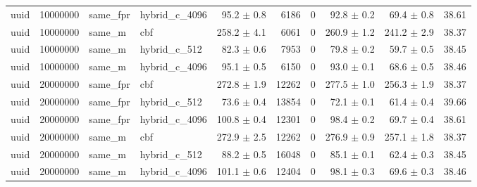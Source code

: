 \begin{tabular}{llllrrrrrr}
uuid & 10000000 & same\_fpr & hybrid\_c\_4096 & 95.2 $\pm$ 0.8 & 6186 & 0 & 92.8 $\pm$ 0.2 & 69.4 $\pm$ 0.8 & 38.61 \\
uuid & 10000000 & same\_m & cbf & 258.2 $\pm$ 4.1 & 6061 & 0 & 260.9 $\pm$ 1.2 & 241.2 $\pm$ 2.9 & 38.37 \\
uuid & 10000000 & same\_m & hybrid\_c\_512 & 82.3 $\pm$ 0.6 & 7953 & 0 & 79.8 $\pm$ 0.2 & 59.7 $\pm$ 0.5 & 38.45 \\
uuid & 10000000 & same\_m & hybrid\_c\_4096 & 95.1 $\pm$ 0.5 & 6150 & 0 & 93.0 $\pm$ 0.1 & 68.6 $\pm$ 0.5 & 38.46 \\
uuid & 20000000 & same\_fpr & cbf & 272.8 $\pm$ 1.9 & 12262 & 0 & 277.5 $\pm$ 1.0 & 256.3 $\pm$ 1.9 & 38.37 \\
uuid & 20000000 & same\_fpr & hybrid\_c\_512 & 73.6 $\pm$ 0.4 & 13854 & 0 & 72.1 $\pm$ 0.1 & 61.4 $\pm$ 0.4 & 39.66 \\
uuid & 20000000 & same\_fpr & hybrid\_c\_4096 & 100.8 $\pm$ 0.4 & 12301 & 0 & 98.4 $\pm$ 0.2 & 69.7 $\pm$ 0.4 & 38.61 \\
uuid & 20000000 & same\_m & cbf & 272.9 $\pm$ 2.5 & 12262 & 0 & 276.9 $\pm$ 0.9 & 257.1 $\pm$ 1.8 & 38.37 \\
uuid & 20000000 & same\_m & hybrid\_c\_512 & 88.2 $\pm$ 0.5 & 16048 & 0 & 85.1 $\pm$ 0.1 & 62.4 $\pm$ 0.3 & 38.45 \\
uuid & 20000000 & same\_m & hybrid\_c\_4096 & 101.1 $\pm$ 0.6 & 12404 & 0 & 98.1 $\pm$ 0.3 & 69.6 $\pm$ 0.3 & 38.46 \\
\bottomrule
\end{tabular}
